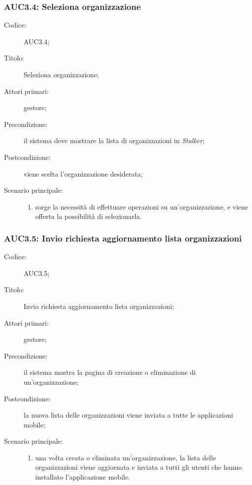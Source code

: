 \documentclass[../../../analisi-dei-requisiti.tex]{subfiles}
\begin{document}
\subsubsection{AUC3.4: Seleziona organizzazione}%
\label{subs:AUC3.4}
\begin{description}
  \item[Codice:] AUC3.4;
  \item[Titolo:] Seleziona organizzazione;
  \item[Attori primari:] gestore;
  \item[Precondizione:] il sistema deve mostrare la lista di organizzazioni in \emph{Stalker};
  \item[Postcondizione:] viene scelta l'organizzazione desiderata;
  \item[Scenario principale:]
        \begin{enumerate}
          \item sorge la necessità di effettuare operazioni su un'organizzazione, e viene offerta la possibilità di selezionarla.
        \end{enumerate}
\end{description}

\subsubsection{AUC3.5: Invio richiesta aggiornamento lista organizzazioni}%
\label{subs:AUC3.5}
\begin{description}
  \item[Codice:] AUC3.5;
  \item[Titolo:] Invio richiesta aggiornamento lista organizzazioni;
  \item[Attori primari:] gestore;
  \item[Precondizione:] il sistema mostra la pagina di creazione o eliminazione di un'organizzazione;
  \item[Postcondizione:] la nuova lista delle organizzazioni viene inviata a tutte le applicazioni mobile;
  \item[Scenario principale:]
        \begin{enumerate}
          \item una volta creata o eliminata un'organizzazione, la lista delle organizzazioni viene aggiornata e inviata a tutti gli utenti che hanno installato l'applicazione mobile.
        \end{enumerate}
\end{description}
\end{document}
